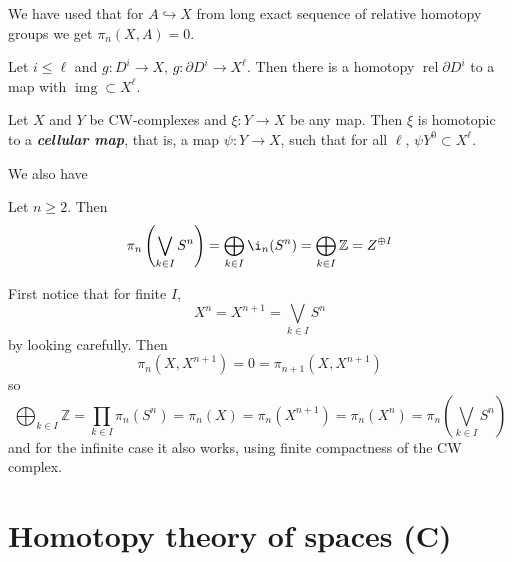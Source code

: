 \begin{remark}
	We have used that for $A\hookrightarrow X$ from long exact sequence of relative homotopy groups we get $\pi_n(X,A)=0$.
\end{remark}

\begin{coro}
	Let $i\leq \ell$ and $g: D^i\to X$, $g:\partial D^i\to X^\ell$. Then there is a homotopy $\operatorname{rel}\partial D^i$ to a map with $\operatorname{img}\subset X^\ell$.
\end{coro}

\begin{thm}
	Let $X$ and $Y$ be CW-complexes and $\xi:Y\to X$ be any map. Then $\xi$ is homotopic to a \textbf{\textit{cellular map}}, that is, a map $\psi:Y\to X$, such that for all $\ell$, $\psi Y^0\subset X^\ell$.
\end{thm}

We also have
\begin{prop}
	Let $n\geq 2$. Then 
	\[\pi_n\left(\bigvee_{k\in I}S^n\right)=\bigoplus_{k\in I}\i_n(S^n)=\bigoplus_{k\in I}\mathbb{Z}=Z^{\oplus I}\]
\end{prop}
\begin{prop}
	First notice that for finite $I$,
	\[X^n=X^{n+1}=\bigvee_{k\in I}S^n\]
	by looking carefully. Then
	\[\pi_n(X,X^{n+1})=0=\pi_{n+1}(X,X^{n+1})\]
	so
	\[\bigoplus_{k\in I}\mathbb{Z}=\prod_{k\in I}\pi_n(S^n)=\pi_n(X)=\pi_n(X^{n+1})=\pi_n(X^n)=\pi_n\left(\bigvee_{k\in I}S^n\right)\]
	and for the infinite case it also works, using finite compactness of the CW complex.
\end{prop}

\section{Homotopy theory of spaces (C)}

